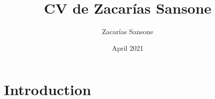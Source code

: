 \documentclass{article}
\title{CV de Zacarías Sansone}
\author{Zacarías Sansone}
\date{April 2021}
\begin{document}
\maketitle

\section{Introduction}
\end{document}
